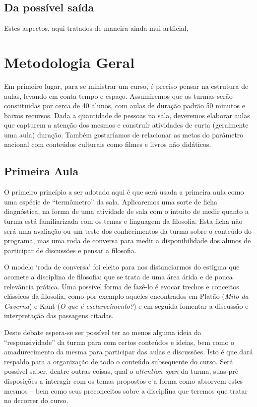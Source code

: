 \documentclass[12pt,a4paper]{article}
\begin{document}
	\subsection*{Da possível saída}
	
	Estes aspectos, aqui tratados de maneira ainda mui artficial, 	

	\newpage
	
	\section{Metodologia Geral}
	
	Em primeiro lugar, para se ministrar um curso, é preciso pensar na 
	estrutura de aulas, levando em conta tempo e espaço. Assumiremos que 
	as turmas serão constituidas por cerca de 40 alunos, com aulas de 
	duração padrão 50 minutos e baixos recursos. Dada a quantidade de 
	pessoas na sala, deveremos elaborar aulas que capturem a atenção dos 
	mesmos e construír atividades de curta (geralmente uma aula) duração.
	Também gostaríamos de relacionar as metas do parâmetro nacional com 
	conteúdos culturais como filmes e livros não didáticos.	

	\subsection*{Primeira Aula}

	O primeiro princípio a ser adotado aqui é que será usada a primeira aula 
	como uma espécie de ``termômetro'' da sala. Aplicaremos uma sorte de 
	ficha diagnóstica, na forma de uma atividade de sala com o intuito 
	de medir quanto a turma está familiarizada com os temas e linguagem 
	da filosofia. Esta ficha não será uma avaliação ou um teste dos 
	conhecimentos da turma sobre o conteúdo do programa, mas uma roda de 
	conversa para medir a disponibilidade dos alunos de participar de 
	discussões e pensar a filosofia. 
	
	O modelo `roda de conversa' foi eleito 
	para nos distanciarmos do estigma que acomete a disciplina de filosofia:
	que se trata de uma área árida e de pouca relevância prática.
	Uma possível forma de fazê-lo é evocar trechos e conceitos 
	clássicos da filosofia, como por exemplo aqueles encontrados em 
	Platão (\textit{Mito da Caverna}) e Kant (\textit{O que é 
	esclarecimento?}) e em seguida fomentar a discussão e interpretação das 
	passagens citadas.

	Deste debate espera-se ser possível ter ao menos alguma ideia da 
	``responsividade'' da turma para com certos conteúdos e ideias, 
	bem como o amadurecimento da mesma para participar das aulas 
	e discussões. Isto é que dará respaldo para a organização de 
	todo o conteúdo subsequente do curso. Será possível saber, dentre 
	outras coisas, qual o \emph{attention span} da turma, suas 
	pré-disposições a interagir com os temas propostos e a forma 
	como absorvem estes mesmos -- bem como seus preconceitos sobre 
	a disciplina que teremos que tratar no decorrer do curso. 
	
\end{document}
